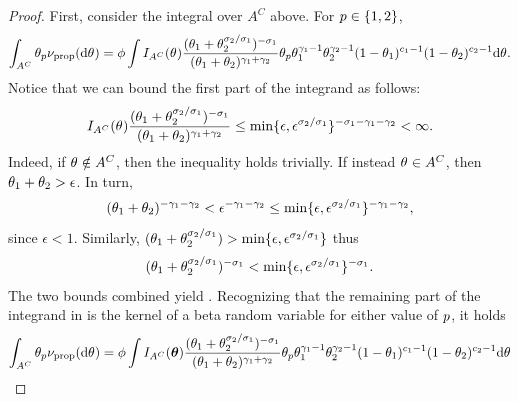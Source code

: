 \begin{proof}
    First, consider the integral over $A^C$ above. For $p\in\{1,2\}$,
    	\begin{equation}
    		\int_{A^C}\variantfreqperpop{\popidx}\ratemeasproposed(\de\vecvariantfreq{}) =  \phi \int I_{A^C}(\vecvariantfreq{})\frac{(\variantfreqperpop{1}+\variantfreqperpop{2}^{\rate{2}/\rate{1}})^{-\rate{1}}}{(\variantfreqperpop{1}+\variantfreqperpop{2})^{\corr{1}+\corr{2}}}\variantfreqperpop{\popidx}\variantfreqperpop{1}^{\corr{1}-1}\variantfreqperpop{2}^{\corr{2}-1}(1-\variantfreqperpop{1})^{\conc{1}-1}(1-\variantfreqperpop{2})^{\conc{2}-1}  \de\vecvariantfreq{}. \label{eq:int_AC}
    	\end{equation}
    Notice that  we can bound the first part of the integrand as follows:
   	\begin{equation}
   		I_{A^C}( \vecvariantfreq{})\frac{(\variantfreqperpop{1}+\variantfreqperpop{2}^{\rate{2}/\rate{1}})^{-\rate{1}}}{(\variantfreqperpop{1}+\variantfreqperpop{2})^{\corr{1}+\corr{2}}}
		\le \min\{\epsilon,\epsilon^{\rate{2}/\rate{1}}\}^{-\rate{1}-\corr{1}-\corr{2}}<\infty. \label{eq:bound_betas}
	\end{equation}
	Indeed, if $\vecvariantfreq{}\notin A^C$, then the inequality holds trivially. If instead $\vecvariantfreq{}\in A^C$, then $ \theta_{1} + \theta_{2} >\epsilon$. In turn, 
	\[
		(\theta_{1}+\theta_{2})^{-\gamma_{1}-\gamma_{2}}< \epsilon^{-\gamma_{1}-\gamma_{2}} \le \min\{\epsilon, \epsilon^{\sigma_{2}/\sigma_{1}}  \}^{-\gamma_{1}-\gamma_{2}},
	\] 
	since $\epsilon < 1$. 
	Similarly, 
	$
		(\theta_{1} + \theta_{2}^{\sigma_{2}/\sigma_{1}})> \min \{ \epsilon, \epsilon^{\sigma_{2}/\sigma_{1}} \}
	$
	thus 
	\[
		(\theta_{1}+\theta_{2}^{\sigma_{2}/\sigma_{1}})^{-\sigma_{1}} < \min \{ \epsilon, \epsilon^{\sigma_{2}/\sigma_{1}} \}^{-\sigma_{1}}.
	\]
	 The two bounds combined yield . Recognizing that the remaining part of the integrand in  is the kernel of a beta random variable for either value of $p$, it holds
	 \begin{align}
	 	\int_{A^C}  \variantfreqperpop{\popidx}\ratemeasproposed(\de\vecvariantfreq{}) &= \phi \int I_{A^C}(\btheta)\frac{(\variantfreqperpop{1}+\variantfreqperpop{2}^{\rate{2}/\rate{1}})^{-\rate{1}}}{(\variantfreqperpop{1}+\variantfreqperpop{2})^{\corr{1}+\corr{2}}}\variantfreqperpop{\popidx}\variantfreqperpop{1}^{\corr{1}-1}\variantfreqperpop{2}^{\corr{2}-1}(1-\variantfreqperpop{1})^{\conc{1}-1}(1-\variantfreqperpop{2})^{\conc{2}-1}\de\vecvariantfreq{}  \nonumber \\

\end{align}
\end{proof}
